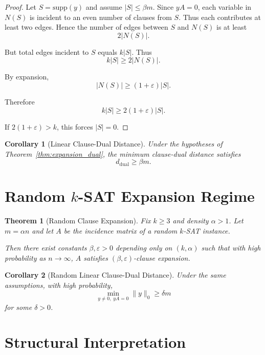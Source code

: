 \documentclass[11pt]{article}
\newtheorem{theorem}{Theorem}
\newtheorem{corollary}{Corollary}
\newcommand{\supp}{\mathrm{supp}}
\begin{document}
\begin{proof}
Let $S = \supp(y)$ and assume $|S| \le \beta m$.
Since $yA=0$, each variable in $N(S)$ is incident to
an even number of clauses from $S$.
Thus each contributes at least two edges.
Hence the number of edges between $S$ and $N(S)$ is at least
\[
2|N(S)|.
\]

But total edges incident to $S$ equals $k|S|$.
Thus
\[
k|S| \ge 2|N(S)|.
\]

By expansion,
\[
|N(S)| \ge (1+\varepsilon)|S|.
\]

Therefore
\[
k|S| \ge 2(1+\varepsilon)|S|.
\]

If $2(1+\varepsilon) > k$, this forces $|S|=0$.
\end{proof}

\begin{corollary}[Linear Clause-Dual Distance]
Under the hypotheses of Theorem~\ref{thm:expansion_dual},
the minimum clause-dual distance satisfies
\[
d_{\mathrm{dual}} \ge \beta m.
\]
\end{corollary}

\section{Random $k$-SAT Expansion Regime}

\begin{theorem}[Random Clause Expansion]
Fix $k \ge 3$ and density $\alpha > 1$.
Let $m = \alpha n$ and let $A$ be the incidence matrix
of a random $k$-SAT instance.

Then there exist constants $\beta,\varepsilon>0$
depending only on $(k,\alpha)$ such that
with high probability as $n \to \infty$,
$A$ satisfies $(\beta,\varepsilon)$-clause expansion.
\end{theorem}

\begin{corollary}[Random Linear Clause-Dual Distance]
Under the same assumptions,
with high probability,
\[
\min_{y \ne 0,\; yA=0} \|y\|_0
\ge
\delta m
\]
for some $\delta>0$.
\end{corollary}

\section{Structural Interpretation}
\end{document}

